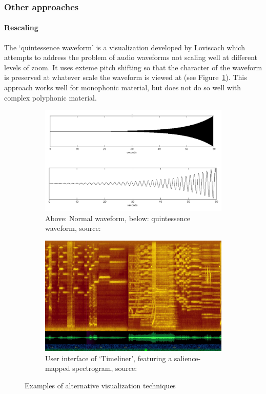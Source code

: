 \subsubsection{Other approaches}

\paragraph{Rescaling}
The `quintessence waveform' is a visualization developed by Loviscach
\cite{Loviscach2011} which attempts to address the problem of audio waveforms
not scaling well at different levels of zoom. It uses exteme pitch shifting so
that the character of the waveform is preserved at whatever scale the waveform
is viewed at (see Figure~\ref{fig:quint}). This approach works well for
monophonic material, but does not do so well with complex polyphonic material.

\begin{figure}[ht]
\centering
\begin{subfigure}{.5\textwidth}
  \centering
  \includegraphics[width=0.95\linewidth]{figs/quint.png}
  \caption{Above: Normal waveform, below: quintessence waveform, source:
  \cite{Loviscach2011}}
  \label{fig:quint}
\end{subfigure}%
\begin{subfigure}{.5\textwidth}
  \centering
  \includegraphics[width=0.95\linewidth]{figs/timeliner.png}
  \caption{User interface of `Timeliner', featuring a salience-mapped
    spectrogram, source: \cite{Goudeseune2012}}
  \label{fig:timeliner}
\end{subfigure}
  \caption{Examples of alternative visualization techniques}
\label{fig:altvis}
\end{figure}

